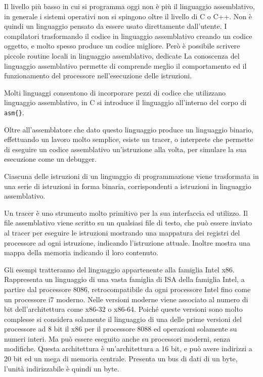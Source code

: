 \documentclass{article}
\numberwithin{equation}{subsection}
\begin{document}
Il livello più basso in cui si programma oggi non è più il linguaggio assemblativo, in generale i sistemi operativi non si spingono oltre il livello di C o C++. Non è quindi un 
linguaggio pensato da essere usato direttamente dall'utente. I compilatori trasformando il codice in linguaggio assemblativo creando un codice oggetto, e molto spesso produce 
un codice migliore. Però è possibile scrivere piccole routine locali in linguaggio assemblativo, dedicate
La conoscenza del linguaggio assemblativo permette di comprende meglio il comportamento ed il funzionamento del processore nell'esecuzione delle istruzioni. 

Molti linguaggi consentono di incorporare pezzi di codice che utilizzano linguaggio assemblativo, in C si introduce il linguaggio all'interno del corpo di \verb|asm{}|. 

Oltre all'assemblatore che dato questo linguaggio produce un linguaggio binario, effettuando un lavoro molto semplice, esiste un tracer, o interprete che permette di eseguire un 
codice assemblativo un'istruzione alla volta, per simulare la sua esecuzione come un debugger. 

Ciascuna delle istruzioni di un linguaggio di programmazione viene trasformata in una serie di istruzioni in forma binaria, corrispondenti a istruzioni in linguaggio 
assemblativo. 

Un tracer è uno strumento molto primitivo per la sua interfaccia ed utilizzo. Il file assemblativo viene scritto su un qualsiasi file di testo, che può essere inviato 
al tracer per eseguire le istruzioni mostrando una mappatura dei registri del processore ad ogni istruzione, indicando l'istruzione attuale. Inoltre mostra una mappa della 
memoria indicando il loro contenuto. 

Gli esempi tratteranno del linguaggio appartenente alla famiglia Intel x86. Rappresenta un linguaggio di una vasta famiglia di ISA della famiglia Intel, a partire dal 
processore 8086, retrocompatibile da ogni processore Intel fino come un processore i7 moderno. 
Nelle versioni moderne viene associato al numero di bit dell'architettura come x86-32 o x86-64. 
Poiché queste versioni sono molto complesse si considera solamente il linguaggio di una delle prime versioni del processore ad 8 bit il x86 per il processore 8088 ed operazioni 
solamente su numeri interi. 
Ma può essere eseguito anche su processori moderni, senza modifiche. 
Questa architettura è un'architettura a 16 bit, e può avere indirizzi a 20 bit ed un mega di memoria centrale. Presenta un bus di dati di un byte, l'unità indirizzabile è quindi 
un byte. 
\end{document}
